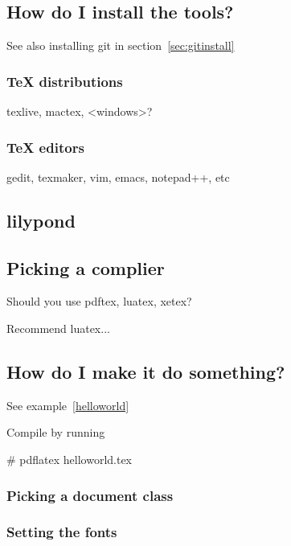 \documentclass[12pt]{scrartcl}
\newcommand*{\texample}[1]{
		\lstset{
			frame=shadowbox,
			title=#1.tex,
			caption=[file: #1.tex]#1.tex,
			label=#1
		}
		
	}
\begin{document}
\subsection{How do I install the tools?}
\label{sec:install}

See also installing git in section~\vref{sec:gitinstall}

\subsubsection{TeX distributions}

texlive, mactex, <windows>?

\subsubsection{TeX editors}

gedit, texmaker, vim, emacs, notepad++, etc

\subsection{lilypond}

\subsection{Picking a complier}
\label{sec:compiler}


Should you use pdftex, luatex, xetex?

Recommend luatex...

\subsection{How do I make it do something?}

\texample{helloworld}

See example~\vref{helloworld}

Compile by running

\begin{ExampleShell}# pdflatex helloworld.tex
\end{ExampleShell}

\subsubsection{Picking a document class}

\subsubsection{Setting the fonts}
\end{document}
